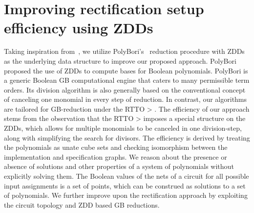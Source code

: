 \section{Improving rectification setup efficiency using ZDDs}\label{impl}


Taking inspiration from~\cite{Utkarsh:TCAD19}, we utilize 
PolyBori’s~\cite{pbori:JSC09} reduction procedure with 
ZDDs~\cite{Minato:DAC93,Minato:DAC94} as the underlying data structure 
to improve our proposed approach.
PolyBori proposed the use of ZDDs to compute
\Grobner bases for Boolean polynomials. PolyBori is a generic Boolean GB computational
engine that caters to many permissible term orders. Its division algorithm is also generally
based on the conventional concept of canceling one monomial in every step of reduction.
In contrast, our algorithms are tailored for GB-reduction under the RTTO > . The efficiency
of our approach stems from the observation that the RTTO > imposes a special structure
on the ZDDs, which allows for multiple monomials to be canceled in one division-step,
along with simplifying the search for divisors.
The efficiency is derived by treating the polynomials 
as unate cube sets and checking isomorphism between the implementation and specification 
graphs. We reason about the presence or absence of solutions and other properties of a 
system of polynomials without explicitly solving them. 
The Boolean values of the nets of a circuit for all possible input assignments is a set 
of points, which can be construed as solutions to a set of polynomials.
We further improve upon the rectification approach by exploiting the circuit 
topology and ZDD based GB reductions.